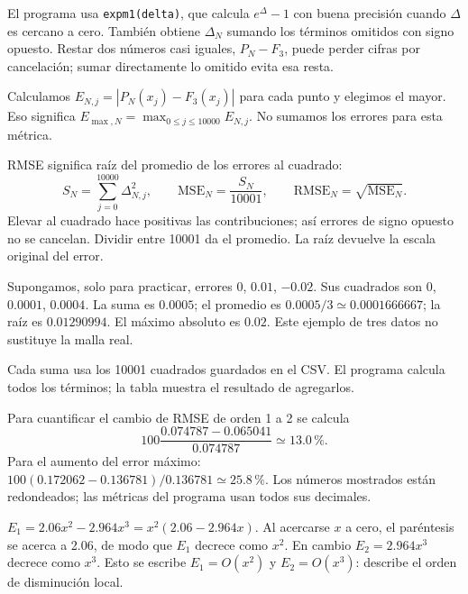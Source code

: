 El programa usa \texttt{expm1(delta)}, que calcula $e^\Delta-1$ con buena precisión cuando $\Delta$ es cercano a cero. También obtiene $\Delta_N$ sumando los términos omitidos con signo opuesto. Restar dos números casi iguales, $P_N-F_3$, puede perder cifras por cancelación; sumar directamente lo omitido evita esa resta.

Calculamos $E_{N,j}=|P_N(x_j)-F_3(x_j)|$ para cada punto y elegimos el mayor. Eso significa $E_{\max,N}=\max_{0\leq j\leq10000} E_{N,j}$. No sumamos los errores para esta métrica.

RMSE significa raíz del promedio de los errores al cuadrado:
\[
S_N=\sum_{j=0}^{10000}\Delta_{N,j}^2,\qquad
\mathrm{MSE}_N=\frac{S_N}{10001},\qquad
\mathrm{RMSE}_N=\sqrt{\mathrm{MSE}_N}.
\]
Elevar al cuadrado hace positivas las contribuciones; así errores de signo opuesto no se cancelan. Dividir entre 10001 da el promedio. La raíz devuelve la escala original del error.

Supongamos, solo para practicar, errores $0$, $0.01$, $-0.02$. Sus cuadrados son $0$, $0.0001$, $0.0004$. La suma es $0.0005$; el promedio es $0.0005/3\simeq0.0001666667$; la raíz es $0.01290994$. El máximo absoluto es $0.02$. Este ejemplo de tres datos no sustituye la malla real.

\begin{center}\small\end{center}
Cada suma usa los 10001 cuadrados guardados en el CSV. El programa calcula todos los términos; la tabla muestra el resultado de agregarlos.

\begin{center}\end{center}
Para cuantificar el cambio de RMSE de orden 1 a 2 se calcula
\[
100\frac{0.074787-0.065041}{0.074787}\simeq13.0\,\%.
\]
Para el aumento del error máximo: $100(0.172062-0.136781)/0.136781\simeq25.8\,\%$. Los números mostrados están redondeados; las métricas del programa usan todos sus decimales.

$E_1=2.06x^2-2.964x^3=x^2(2.06-2.964x)$. Al acercarse $x$ a cero, el paréntesis se acerca a 2.06, de modo que $E_1$ decrece como $x^2$. En cambio $E_2=2.964x^3$ decrece como $x^3$. Esto se escribe $E_1=O(x^2)$ y $E_2=O(x^3)$: describe el orden de disminución local.

